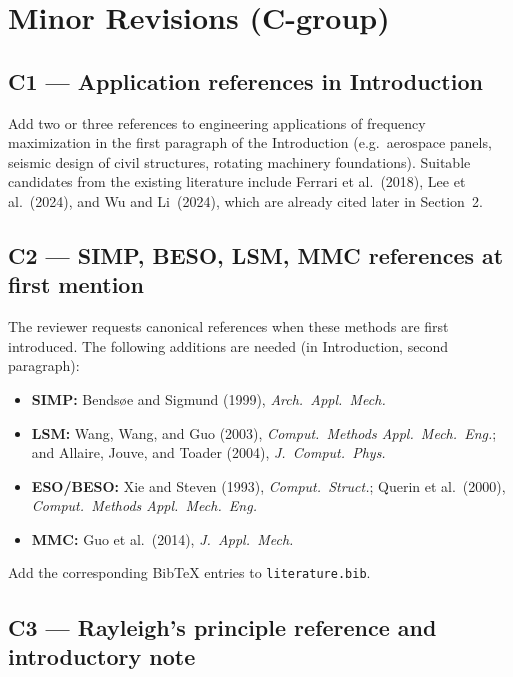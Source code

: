 \documentclass[12pt,a4paper]{article}
\begin{document}
\newpage
\section{Minor Revisions (C-group)}

\subsection{C1 — Application references in Introduction}

Add two or three references to engineering applications of frequency
maximization in the first paragraph of the Introduction
(e.g.\ aerospace panels, seismic design of civil structures, rotating
machinery foundations). Suitable candidates from the existing literature
include Ferrari et al.~(2018), Lee et al.~(2024), and Wu and Li~(2024),
which are already cited later in Section~2.

\subsection{C2 — SIMP, BESO, LSM, MMC references at first mention}

The reviewer requests canonical references when these methods are first
introduced. The following additions are needed (in Introduction, second
paragraph):

\begin{itemize}[leftmargin=1.6em]
  \item \textbf{SIMP:} Bends\o{}e and Sigmund (1999), \emph{Arch.\ Appl.\
        Mech.}
  \item \textbf{LSM:} Wang, Wang, and Guo (2003), \emph{Comput.\ Methods
        Appl.\ Mech.\ Eng.}; and Allaire, Jouve, and Toader (2004),
        \emph{J.\ Comput.\ Phys.}
  \item \textbf{ESO/BESO:} Xie and Steven (1993), \emph{Comput.\ Struct.};
        Querin et al.\ (2000), \emph{Comput.\ Methods Appl.\ Mech.\ Eng.}
  \item \textbf{MMC:} Guo et al.\ (2014), \emph{J.\ Appl.\ Mech.}
\end{itemize}

Add the corresponding BibTeX entries to \texttt{literature.bib}.

\subsection{C3 — Rayleigh's principle reference and introductory note}
\end{document}
